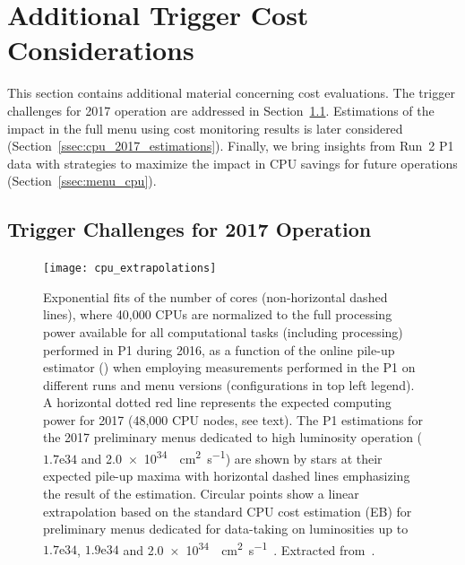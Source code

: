 \section{Additional Trigger Cost Considerations}\label{sec:additional_trigger_cost}

This section contains additional material concerning cost evaluations. The
trigger challenges for 2017 operation are addressed in
Section~\ref{ssec:trigger_2017}.  Estimations of the \rnn{} impact in the full
menu using cost monitoring results is later considered
(Section~\ref{ssec:cpu_2017_estimations}). Finally, we bring insights from Run~2
P1 data with strategies to maximize the impact in CPU savings for future
operations (Section~\ref{ssec:menu_cpu}).

\subsection{Trigger Challenges for 2017 Operation}\label{ssec:trigger_2017}

\begin{figure}[b]
\centering
\texttt{[image: cpu\_extrapolations]}
\caption{\label{fig:cpu_extrapolations}
Exponential fits of the number of cores (non-horizontal dashed lines), where
40,000 CPUs are normalized to the full processing power available for all
computational tasks (including \hlt{} processing) performed in P1 during 2016, as
a function of the online pile-up estimator (\avgmu{}) when employing measurements
performed in the P1 on different runs and menu versions (configurations in top
left legend). A horizontal dotted red line represents the expected computing
power for 2017 (48,000 CPU nodes, see text). The P1 estimations for
the 2017 preliminary menus dedicated to high luminosity operation
($\text{1.7e34}$ and \SI[parse-numbers =
false]{2.0e34}{\per\square\cm\per\second}) are shown by stars at their expected
pile-up maxima with horizontal dashed lines emphasizing the result of the
estimation. Circular points show a linear extrapolation based on the standard
CPU cost estimation (EB) for preliminary menus dedicated for data-taking on
luminosities up to $\text{1.7e34}$, $\text{1.9e34}$ and \SI[parse-numbers =
false]{2.0e34}{\per\square\cm\per\second}~\cite{ATR-16227}. Extracted
from~\cite{Martin2017b}.}
\end{figure}


